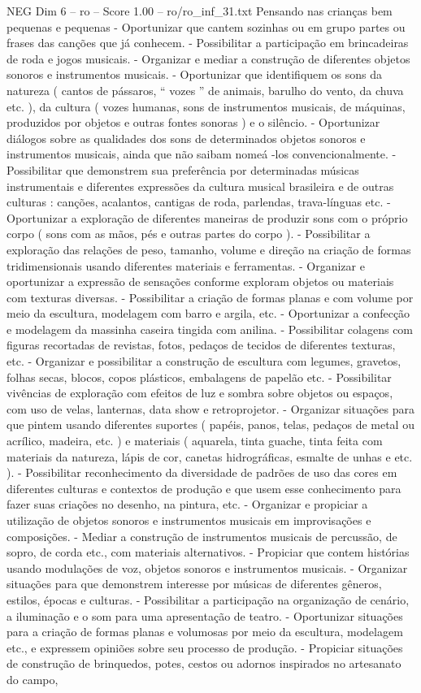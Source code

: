 \begin{textsample}{NEG Dim 6 – ro – Score 1.00 – ro/ro\_inf\_31.txt}
Pensando nas crianças bem pequenas e pequenas - Oportunizar que cantem sozinhas ou em grupo partes ou frases das canções que já conhecem. - Possibilitar a participação em brincadeiras de roda e jogos musicais. - Organizar e mediar a construção de diferentes objetos sonoros e instrumentos musicais. - Oportunizar que identifiquem os sons da natureza ( cantos de pássaros, “ vozes ” de animais, barulho do vento, da chuva etc. ), da cultura ( vozes humanas, sons de instrumentos musicais, de máquinas, produzidos por objetos e outras fontes sonoras ) e o silêncio. - Oportunizar diálogos sobre as qualidades dos sons de determinados objetos sonoros e instrumentos musicais, ainda que não saibam nomeá -los convencionalmente. - Possibilitar que demonstrem sua preferência por determinadas músicas instrumentais e diferentes expressões da cultura musical brasileira e de outras culturas : canções, acalantos, cantigas de roda, parlendas, trava-línguas etc. - Oportunizar a exploração de diferentes maneiras de produzir sons com o próprio corpo ( sons com as mãos, pés e outras partes do corpo ). - Possibilitar a exploração das relações de peso, tamanho, volume e direção na criação de formas tridimensionais usando diferentes materiais e ferramentas. - Organizar e oportunizar a expressão de sensações conforme exploram objetos ou materiais com texturas diversas. - Possibilitar a criação de formas planas e com volume por meio da escultura, modelagem com barro e argila, etc. - Oportunizar a confecção e modelagem da massinha caseira tingida com anilina. - Possibilitar colagens com figuras recortadas de revistas, fotos, pedaços de tecidos de diferentes texturas, etc. - Organizar e possibilitar a construção de escultura com legumes, gravetos, folhas secas, blocos, copos plásticos, embalagens de papelão etc. - Possibilitar vivências de exploração com efeitos de luz e sombra sobre objetos ou espaços, com uso de velas, lanternas, data show e retroprojetor. - Organizar situações para que pintem usando diferentes suportes ( papéis, panos, telas, pedaços de metal ou acrílico, madeira, etc. ) e materiais ( aquarela, tinta guache, tinta feita com materiais da natureza, lápis de cor, canetas hidrográficas, esmalte de unhas e etc. ). - Possibilitar reconhecimento da diversidade de padrões de uso das cores em diferentes culturas e contextos de produção e que usem esse conhecimento para fazer suas criações no desenho, na pintura, etc. - Organizar e propiciar a utilização de objetos sonoros e instrumentos musicais em improvisações e composições. - Mediar a construção de instrumentos musicais de percussão, de sopro, de corda etc., com materiais alternativos. - Propiciar que contem histórias usando modulações de voz, objetos sonoros e instrumentos musicais. - Organizar situações para que demonstrem interesse por músicas de diferentes gêneros, estilos, épocas e culturas. - Possibilitar a participação na organização de cenário, a iluminação e o som para uma apresentação de teatro. - Oportunizar situações para a criação de formas planas e volumosas por meio da escultura, modelagem etc., e expressem opiniões sobre seu processo de produção. - Propiciar situações de construção de brinquedos, potes, cestos ou adornos inspirados no artesanato do campo, 
\end{textsample}

